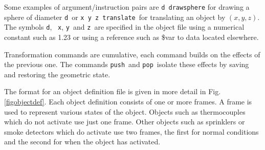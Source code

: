 \documentclass[11pt,twoside]{book}
\begin{document}
Some examples of argument/instruction pairs are {\tt d drawsphere}
for drawing a sphere of diameter {\tt d}\ or {\tt x y z translate}\
for translating an object by $(x,y,z)$. The symbols {\tt d}, {\tt
x}, {\tt y}\ and {\tt z}\ are specified in the object file using a
numerical constant such as 1.23 or using a reference such as \$var
to data located elsewhere.

Transformation commands are cumulative, each command builds on the
effects of the previous one.  The commands {\tt push}\ and
{\tt pop}\ isolate these effects by saving and restoring the geometric state.

The format for an object definition file is given in more detail
in Fig. \ref{figobjectdef}.  Each object definition consists of
one or more frames.  A frame is used to represent various states
of the object. Objects such as thermocouples which do not activate
use just one frame. Other objects such as sprinklers or smoke
detectors which do activate use two frames, the first for normal
conditions and the second for when the object has activated.
\end{document}
